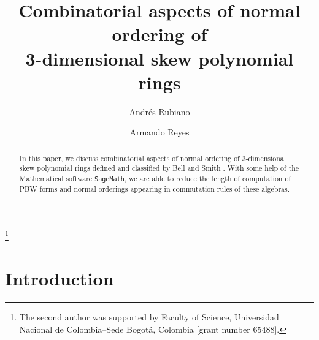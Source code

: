 \documentclass{amsart}
\theoremstyle{definition}
\theoremstyle{remark}
\numberwithin{equation}{section}
\begin{document}
\title[Normal ordering of 3-dimensional skew polynomial rings]{Combinatorial aspects of normal ordering of \\ 3-dimensional skew polynomial rings}


\author{Andr\'es Rubiano}
\address{Universidad Distrital Francisco Jos\'e de Caldas}

\author{Armando Reyes}
\address{Universidad Nacional de Colombia - Sede Bogot\'a}
\thanks{The second author was supported by Faculty of Science, Universidad Nacional de Colombia--Sede Bogot\'a, Colombia [grant number 65488].}



\date{}


\begin{abstract} 

In this paper, we discuss combinatorial aspects of normal ordering of 3-dimensional skew polynomial rings defined and classified by Bell and Smith \cite{BellSmith1990}. With some help of the Mathematical software \texttt{SageMath}, we are able to reduce the length of computation of PBW forms and normal orderings appearing in commutation rules of these algebras.

\end{abstract}

\maketitle


\section{Introduction}
\end{document}
